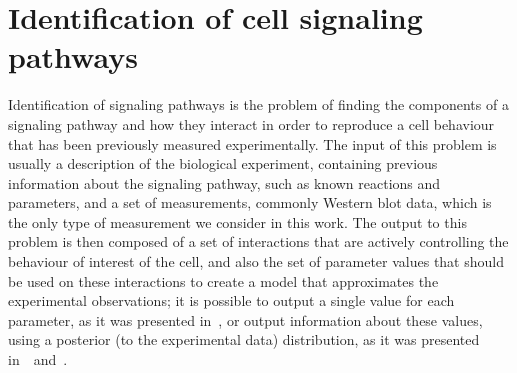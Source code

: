 \section{Identification of cell signaling pathways}
Identification of signaling pathways is the problem of finding the 
components of a signaling pathway and how they interact in order to
reproduce a cell behaviour that has been previously measured 
experimentally. The input of this problem is usually a description of 
the biological experiment, containing previous information about the 
signaling pathway, such as known reactions and parameters, and a set of 
measurements, commonly Western blot data, which is the only type of
measurement we consider in this work. The output to this problem is then
composed of a set of interactions that are actively controlling the
behaviour of interest of the cell, and also the set of parameter values 
that should be used on these interactions to create a model that
approximates the experimental observations; it is possible to output a
single value for each parameter, as it was presented in~\cite{Wu15}, or
output information about these values, using a posterior (to the
experimental data) distribution, as it was presented
in~\cite{Liepe2014}~and~\cite{Xura20}.

